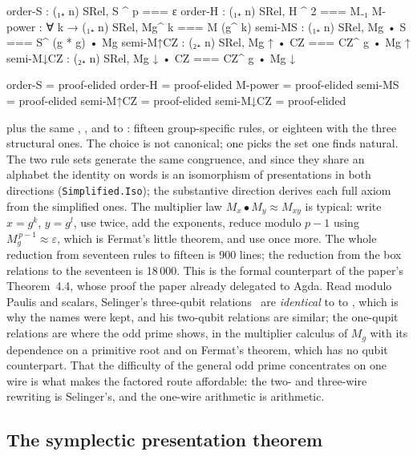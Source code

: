 \begin{code}
order-S :           (₁₊ n) SRel,  S ^ p === ε
order-H :           (₁₊ n) SRel,  H ^ 2 === M₋₁
M-power :     ∀ k → (₁₊ n) SRel,  Mg^ k === M (g^ k)
semi-MS :           (₁₊ n) SRel,  Mg • S === S^ (g * g) • Mg
semi-M↑CZ :         (₂₊ n) SRel,  Mg ↑ • CZ === CZ^ g • Mg ↑
semi-M↓CZ :         (₂₊ n) SRel,  Mg ↓ • CZ === CZ^ g • Mg ↓
\end{code}
\begin{code}[hide]
order-S = proof-elided
order-H = proof-elided
M-power = proof-elided
semi-MS = proof-elided
semi-M↑CZ = proof-elided
semi-M↓CZ = proof-elided
\end{code}

plus the same , ,  and
 to : fifteen group-specific rules, or
eighteen with the three structural ones.  The choice is not canonical;
one picks the set one finds natural.  The two rule sets generate the
same congruence, and since they share an alphabet the identity on words
is an isomorphism of presentations in both directions
(\texttt{Simplified.Iso}); the substantive direction derives each full
axiom from the simplified ones.  The multiplier law $M_x \bullet M_y
\approx M_{xy}$ is typical: write $x = g^{k}$, $y = g^{l}$, use
 twice, add the exponents, reduce modulo $p-1$ using
$M_g^{\,p-1} \approx \varepsilon$, which is Fermat's little theorem, and
use  once more.  The whole reduction from seventeen rules
to fifteen is 900 lines; the reduction from the box relations to the
seventeen is 18\,000.  This is the formal counterpart of the paper's
Theorem~4.4, whose proof the paper already delegated to Agda.  Read
modulo Paulis and scalars, Selinger's three-qubit
relations~\cite{selinger2015clifford} are \emph{identical} to
 to , which is why the names were kept, and
his two-qubit relations are similar; the one-qupit relations are where
the odd prime shows, in the multiplier calculus of $M_g$ with its
dependence on a primitive root and on Fermat's theorem, which has no
qubit counterpart.  That the difficulty of the general odd prime
concentrates on one wire is what makes the factored route affordable:
the two- and three-wire rewriting is Selinger's, and the one-wire
arithmetic is arithmetic.

\subsection{The symplectic presentation theorem}\label{sec:sptheorem}

